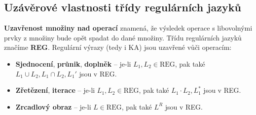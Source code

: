 \subsection{Uzávěrové vlastnosti třídy regulárních jazyků}
\textbf{Uzavřenost množiny nad operací} znamená, že výsledek operace s libovolnými prvky z množiny bude opět spadat do dané množiny. Třídu regulárních jazyků značíme \textbf{REG}. Regulární výrazy (tedy i KA) jsou uzavřené vůči operacím:
\begin{itemize}
	\item \textbf{Sjednocení}, \textbf{průnik}, \textbf{doplněk} -- je-li $L_1, L_2 \in \textrm{REG}$, pak také $L_1 \cup L_2, L_1 \cap L_2, L_1'$ jsou v REG.
	\item \textbf{Zřetězení}, \textbf{iterace} -- je-li $L_1, L_2 \in \textrm{REG}$, pak také $L_1 \cdot L_2, L_1^*$ jsou v REG.
	\item \textbf{Zrcadlový obraz} -- je-li $L \in \textrm{REG}$, pak také $L^R$ jsou v REG.
\end{itemize}

